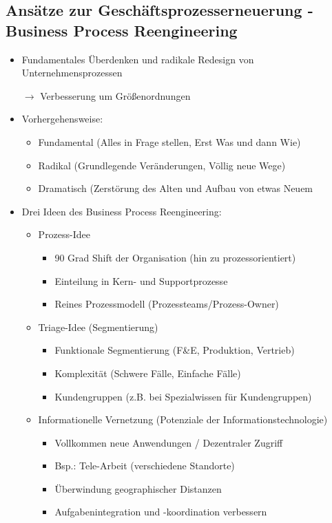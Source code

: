 \documentclass[11pt,a4paper]{article}
\begin{document}
\subsection{Ansätze zur Geschäftsprozesserneuerung - Business Process Reengineering}
\begin{itemize}
\item Fundamentales Überdenken und radikale Redesign von Unternehmensprozessen
\item[$\rightarrow$] Verbesserung um Größenordnungen
\item Vorhergehensweise:
	\begin{itemize}
	\item Fundamental (Alles in Frage stellen, Erst Was und dann Wie)
	\item Radikal (Grundlegende Veränderungen, Völlig neue Wege)
	\item Dramatisch (Zerstörung des Alten und Aufbau von etwas Neuem
	\end{itemize}
\item Drei Ideen des Business Process Reengineering:
	\begin{itemize}
	\item Prozess-Idee
		\begin{itemize}
		\item 90 Grad Shift der Organisation (hin zu prozessorientiert)
		\item Einteilung in Kern- und Supportprozesse
		\item Reines Prozessmodell (Prozessteams/Prozess-Owner)
		\end{itemize}
		
	\item Triage-Idee (Segmentierung)	
		\begin{itemize}
		\item Funktionale Segmentierung (F\&E, Produktion, Vertrieb)
		\item Komplexität (Schwere Fälle, Einfache Fälle)
		\item Kundengruppen (z.B. bei Spezialwissen für Kundengruppen)
		\end{itemize}
		
	\item Informationelle Vernetzung (Potenziale der Informationstechnologie)
		\begin{itemize}
		\item Vollkommen neue Anwendungen / Dezentraler Zugriff
		\item Bsp.: Tele-Arbeit (verschiedene Standorte)
		\item Überwindung geographischer Distanzen
		\item Aufgabenintegration und -koordination verbessern
		\end{itemize}
	\end{itemize}
	

\end{itemize}
\end{document}
